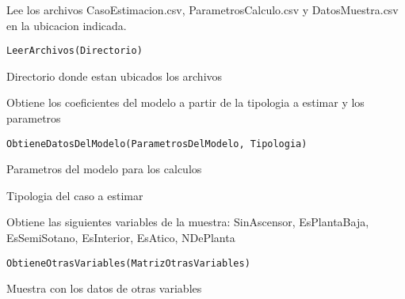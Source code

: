 \documentclass[a4paper]{book}
\begin{document}
%
\begin{Description}\relax
Lee los archivos CasoEstimacion.csv, ParametrosCalculo.csv y DatosMuestra.csv en la ubicacion indicada.
\end{Description}
%
\begin{Usage}
\begin{verbatim}
LeerArchivos(Directorio)
\end{verbatim}
\end{Usage}
%
\begin{Arguments}
\begin{ldescription}
\item[\code{Directorio}] Directorio donde estan ubicados los archivos
\end{ldescription}
\end{Arguments}
%
\begin{Description}\relax
Obtiene los coeficientes del modelo a partir de la tipologia a estimar y los parametros
\end{Description}
%
\begin{Usage}
\begin{verbatim}
ObtieneDatosDelModelo(ParametrosDelModelo, Tipologia)
\end{verbatim}
\end{Usage}
%
\begin{Arguments}
\begin{ldescription}
\item[\code{ParametrosDelModelo}] Parametros del modelo para los calculos
\item[\code{Tipologia}] Tipologia del caso a estimar
\end{ldescription}
\end{Arguments}
%
\begin{Description}\relax
Obtiene las siguientes variables de la muestra:  SinAscensor, EsPlantaBaja, EsSemiSotano, EsInterior, EsAtico, NDePlanta
\end{Description}
%
\begin{Usage}
\begin{verbatim}
ObtieneOtrasVariables(MatrizOtrasVariables)
\end{verbatim}
\end{Usage}
%
\begin{Arguments}
\begin{ldescription}
\item[\code{MatrizOtrasVariables}] Muestra con los datos de otras variables
\end{ldescription}
\end{Arguments}
\end{document}
